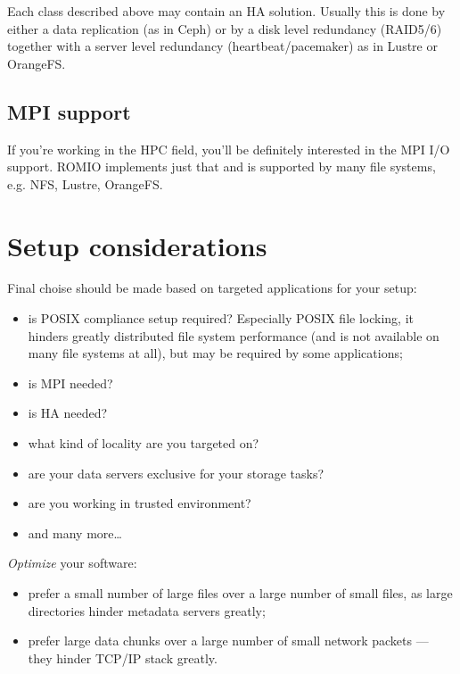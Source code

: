 \documentclass[10pt, a5paper]{article}
\begin{document}
{Each class described above may contain an HA solution. Usually this is done by either a data replication (as in Ceph\cite{bib12}) or by a disk level redundancy (RAID5/6) together with a server level redundancy (heartbeat/pacemaker) as in Lustre\cite{bib10} or OrangeFS\cite{bib11}.

\subsection*{MPI support}

If you're working in the HPC\cite{bib9} field, you'll be definitely interested in the MPI\cite{bib13} I/O support. ROMIO\cite{bib14} implements just that and is supported by many file systems, e.g. NFS\cite{bib3}, Lustre\cite{bib10}, OrangeFS\cite{bib11}.

\section*{Setup considerations}

Final choise should be made based on targeted applications for your setup:

\begin{itemize}
  \item is POSIX compliance setup required? Especially POSIX file locking, it hinders greatly distributed file system performance (and is not available on many file systems at all), but may be required by some applications;
  \item is MPI\cite{bib13} needed?
  \item is HA needed?
  \item what kind of locality are you targeted on?
  \item are your data servers exclusive for your storage tasks?
  \item are you working in trusted environment?
  \item and many more\ldots{}
\end{itemize}

\emph{Optimize} your software:

\begin{itemize}
  \item prefer a small number of large files over a large number of small files, as large directories hinder metadata servers greatly;
  \item prefer large data chunks over a large number of small network packets — they hinder TCP/IP stack greatly.
\end{itemize}

}
\end{document}

